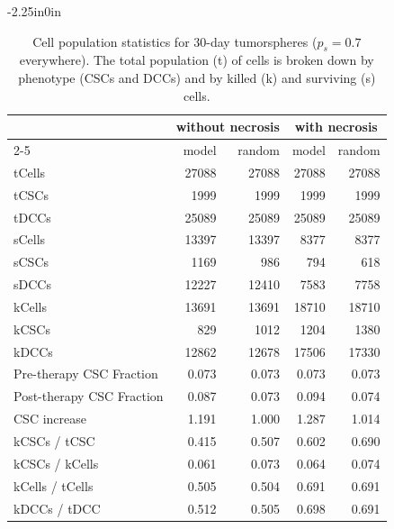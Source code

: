 \documentclass[10pt,letterpaper]{article}
\begin{document}

\begin{table}[!ht]
	\caption{Cell population statistics for 30-day tumorspheres ($p_s=0.7$ everywhere). The total population (t) of cells is broken down by phenotype (CSCs and DCCs) and by killed (k) and surviving (s) cells. }
	\label{table}
	\begin{adjustwidth}{-2.25in}{0in}
		\centering
		\begin{tabular}{||l || r | r || r |r||}
			\toprule
			{} & \multicolumn{2}{c|}{without necrosis}  & \multicolumn{2}{c|}{with necrosis}  \\ \cline{2-5}
			{} & model & random & model & random \\
			\midrule
			tCells & 27088  &27088  & 27088  & 27088 \\
			tCSCs & 1999  & 1999 & 1999 & 1999 \\
			tDCCs & 25089   & 25089 & 25089  & 25089 \\ \midrule
			sCells & 13397  & 13397 & 8377&  8377\\
			sCSCs & 1169 & 986 & 794  & 618 \\
			sDCCs &  12227  &  12410 & 7583 & 7758 \\  \midrule
			kCells & 13691& 13691 & 18710 & 18710\\
			kCSCs & 829  & 1012 & 1204 & 1380 \\
			kDCCs & 12862 &  12678 &  17506 & 17330\\ \midrule
			Pre-therapy CSC Fraction & 0.073 & 0.073& 0.073 & 0.073\\
			Post-therapy CSC Fraction & 0.087 & 0.073 & 0.094 & 0.074\\ 
			CSC increase & 1.191 & 1.000 & 1.287 & 1.014 \\ 
			\midrule
			kCSCs / tCSC & 0.415 &  0.507 & 0.602&  0.690\\
			kCSCs / kCells & 0.061&  0.073& 0.064& 0.074 \\
			kCells / tCells & 0.505 & 0.504 & 0.691 & 0.691  \\
			kDCCs / tDCC& 0.512 & 0.505& 0.698 & 0.691 \\
			\bottomrule
		\end{tabular}
	\end{adjustwidth}
\end{table}
\end{document}

